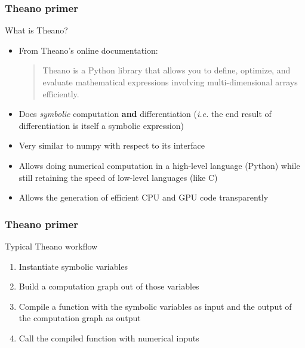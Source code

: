 \documentclass[mathserif, xcolor=dvipsnames]{beamer}
\begin{document}
\begin{frame}
    \frametitle{Theano primer}
    \begin{block}{What is Theano?}
    \begin{itemize}
    \item{From Theano's online documentation:
        \begin{quote}
            Theano is a Python library that allows you to define, optimize,
            and evaluate mathematical expressions involving multi-dimensional
            arrays efficiently.
        \end{quote}}
    \item{Does \emph{symbolic} computation \textbf{and} differentiation
          (\emph{i.e.} the end result of differentiation is itself a symbolic
          expression)}
    \item{Very similar to numpy with respect to its interface}
    \item{Allows doing numerical computation in a high-level language (Python)
          while still retaining the speed of low-level languages (like C)}
    \item{Allows the generation of efficient CPU and GPU code transparently}
    \end{itemize}
    \end{block}
\end{frame}

\begin{frame}
    \frametitle{Theano primer}
    \begin{block}{Typical Theano workflow}
    \begin{enumerate}\addtolength{\itemsep}{1.0\baselineskip}
        \item{Instantiate symbolic variables}
        \item{Build a computation graph out of those variables}
        \item{Compile a function with the symbolic variables as input and the
              output of the computation graph as output}
        \item{Call the compiled function with numerical inputs}
    \end{enumerate}
    \end{block}
\end{frame}
\end{document}
